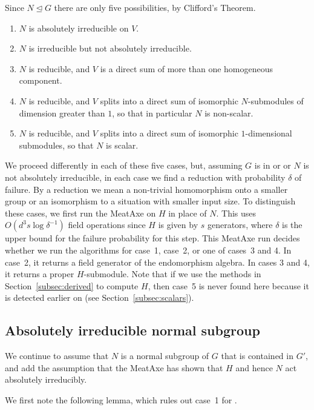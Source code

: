 Since $N \unlhd  G$ there are only five possibilities, 
by Clifford's Theorem. 
\begin{enumerate}
\setlength{\itemsep}{0pt}\setlength{\parskip}{0pt}
\item $N$ is absolutely irreducible on $V$.
\item $N$ is irreducible but not absolutely irreducible.
\item $N$ is reducible, and $V$ is a direct sum of 
more than one homogeneous component.
\item $N$ is reducible, and $V$ splits into a direct 
sum of isomorphic $N$-submodules of dimension greater than $1$, so that in particular $N$ is non-scalar.
\item $N$ is reducible, and $V$ splits into a direct sum of isomorphic $1$-dimensional submodules, so that $N$ is scalar.
\end{enumerate}

We proceed differently in each of these five cases, but, assuming $G$
is in  or  or $N$ is not absolutely irreducible, in each case
we find a reduction with probability $\delta$ of failure. 
By a reduction we mean a non-trivial homomorphism onto a
smaller group or an isomorphism to a situation with smaller input
size. To distinguish these cases, we first run the MeatAxe on $H$ 
in place of $N$.
This uses $O(d^3 s \log \delta^{-1})$ 
field operations since $H$ is given by $s$ generators, where
$\delta$ is the upper bound for the failure probability for this step.
This MeatAxe run decides whether we run the algorithms for
case~1, case~2, or one of
cases~3 and 4. In case~2, it returns a field generator of the endomorphism
algebra. In cases 3 and 4, it returns a proper $H$-submodule. Note
that if we use the methods in Section~\ref{subsec:derived} to compute
$H$, then case~5 is never found here because it is detected earlier on
 (see Section~\ref{subsec:scalars}).


\subsection{Absolutely irreducible normal subgroup}
\label{subsec:subfield_scalars}

We continue to assume that $N$ is a normal subgroup of $G$ that is
contained in $G'$, and add the assumption that the MeatAxe has shown that
$H$ and hence $N$ act absolutely irreducibly.

We first note the following lemma, which rules out case~1 for .

